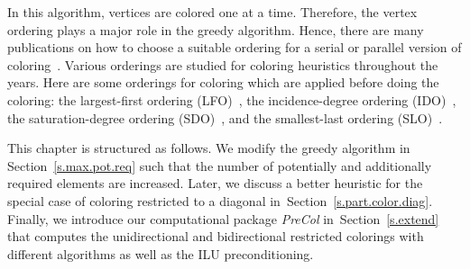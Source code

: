 \documentclass[12pt, twoside,a4paper,toc=bibliography]{scrbook}
\newcommand{\secref}[1]{Section~\protect\ref{#1}}
\begin{document}
In this algorithm, vertices are colored one at a time.
Therefore, the vertex ordering plays a major role in the greedy algorithm.
Hence, there are many publications on how to choose
a suitable ordering for a serial or parallel version of
coloring~\cite{ordering1,ordering2,ordering3}.
Various orderings are studied for coloring heuristics
throughout the years. Here are some orderings for coloring which are applied before doing the coloring:
the largest-first ordering (LFO)~\cite{LFO}, the incidence-degree ordering (IDO)~\cite{IDO},
the saturation-degree ordering (SDO)~\cite{ordering2}, and the smallest-last ordering (SLO)~\cite{ordering1}.

This chapter is structured as follows.
We modify the greedy algorithm in \secref{s.max.pot.req}
such that the number of potentially and additionally required elements are increased.
Later, we discuss a better heuristic for
the special case of coloring restricted to a diagonal in~\secref{s.part.color.diag}.
Finally, we introduce our computational package \textit{PreCol}
in~\secref{s.extend} that computes the
unidirectional and bidirectional restricted colorings with different algorithms
as well as the ILU preconditioning.
\end{document}
